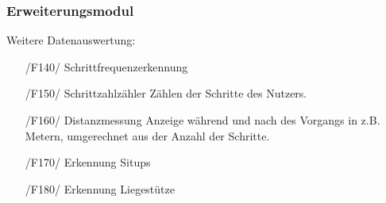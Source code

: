 \documentclass[a4paper,12pt]{article}
\begin{document}
    \subsubsection{Erweiterungsmodul}
      Weitere Datenauswertung:
      \begin{itemize}
      \item[/F140/] \textsf{Schrittfrequenzerkennung}%
      \item[/F150/] \textsf{Schrittzahlzähler} Zählen der Schritte des Nutzers. %
      \item[/F160/] \textsf{Distanzmessung} Anzeige während und nach des Vorgangs in z.B. Metern, umgerechnet aus der Anzahl der Schritte.
      \item[/F170/] \textsf{Erkennung Situps}
      \item[/F180/] \textsf{Erkennung Liegestütze}
      \end{itemize} 
\end{document}
